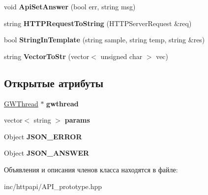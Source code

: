 \begin{DoxyCompactItemize}
void {\bfseries Api\+Set\+Answer} (bool err, string msg)
\item 
\mbox{\label{classAPI__prototype_aeb7bcfcc11c9bd6524456079b7e4dd38}} 
string {\bfseries H\+T\+T\+P\+Request\+To\+String} (H\+T\+T\+P\+Server\+Request \&req)
\item 
\mbox{\label{classAPI__prototype_adbbb480f8d8cbaa5394de2c260fee75e}} 
bool {\bfseries String\+In\+Template} (string sample, string temp, string \&res)
\item 
\mbox{\label{classAPI__prototype_a55655190caf910e19979203466fbe856}} 
string {\bfseries Vector\+To\+Str} (vector$<$ unsigned char $>$ vec)
\end{DoxyCompactItemize}
\subsection*{Открытые атрибуты}
\begin{DoxyCompactItemize}
\item 
\mbox{\label{classAPI__prototype_aef440eab638226863170db3547b77bb1}} 
\hyperlink{classGWThread}{G\+W\+Thread} $\ast$ {\bfseries gwthread}
\item 
\mbox{\label{classAPI__prototype_af10c60957b485d799ccffdb40915e9db}} 
vector$<$ string $>$ {\bfseries params}
\item 
\mbox{\label{classAPI__prototype_a1e791463beff32699e38f1057dfdf712}} 
Object {\bfseries J\+S\+O\+N\+\_\+\+E\+R\+R\+OR}
\item 
\mbox{\label{classAPI__prototype_aa61bd8539d185cb392052a305e040ddd}} 
Object {\bfseries J\+S\+O\+N\+\_\+\+A\+N\+S\+W\+ER}
\end{DoxyCompactItemize}


Объявления и описания членов класса находятся в файле\+:\begin{DoxyCompactItemize}
\item 
inc/httpapi/A\+P\+I\+\_\+prototype.\+hpp\end{DoxyCompactItemize}
